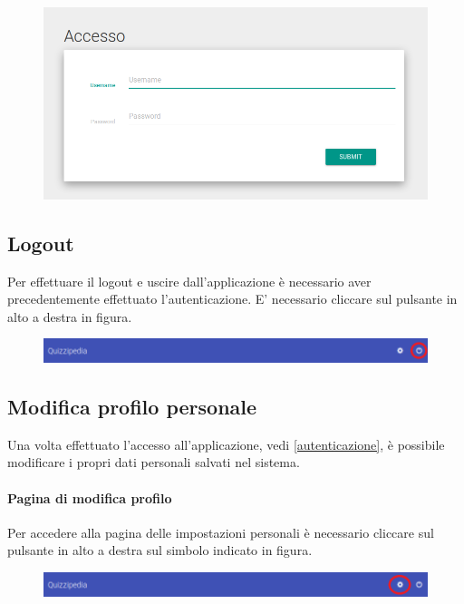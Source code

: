 \documentclass[12pt,a4paper]{article}
\begin{document}
		\begin{figure}[h]
		
		\centering
		\includegraphics[width=0.8\linewidth]{../img/screenshot/login_crop.png}
		\caption{}
		\label{Schermata di autenticazione}
		\end{figure}
		
		
	\subsection{Logout}
	Per effettuare il logout e uscire dall'applicazione è necessario aver precedentemente effettuato l'autenticazione.
	E' necessario cliccare sul pulsante in alto a destra in figura.
	
	
		\begin{figure}[h]
		
		\centering
		\includegraphics[width=1.0\linewidth]{../img/screenshot/barra_logout.png}
		\caption{}
		\label{Pulsante di logout}
		\end{figure}

	\subsection{Modifica profilo personale}
	Una volta effettuato l'accesso all'applicazione, vedi \ref{autenticazione}, è possibile modificare i propri dati personali salvati nel sistema.
    
	\paragraph{Pagina di modifica profilo}Per accedere alla pagina delle impostazioni personali è necessario cliccare sul pulsante in alto a destra sul simbolo indicato in figura.
	
	\begin{figure}[h]
		
		\centering
		\includegraphics[width=1.0\linewidth]{../img/screenshot/barra_impostaz.png}
		\caption{}
		\label{Pulsante di logout}
	\end{figure}
	
\end{document}
